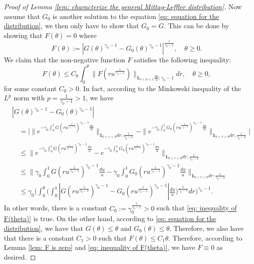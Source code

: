 \documentclass[12pt, a4paper]{amsart}
\theoremstyle{definition}
\numberwithin{equation}{section}
\begin{document}
\begin{proof}[Proof of Lemma \ref{lem: characterize the general Mittag-Leffler distribution}]
	Now assume that $G_0$ is another solution to the equation \eqref{eq: equation for the distribution}, we then only have to show that $G_0 = G$.
	This can be done by showing that $F(\theta) = 0$ where
\[
		F(\theta) := |G(\theta)^{\gamma_0 - 1} - G_0(\theta)^{\gamma_0 - 1}|^{\frac{1}{\gamma_0 - 1}},
		\quad \theta \geq 0.
\]
	We claim that the non-negative function $F$ satisfies 
	the following inequality:
\[\label{eq: inequality of F(theta)}
	F(\theta)
	\leq C_0 \int_0^\theta \|  F(ru^{\frac{1}{\gamma_0 - 1}})\|_{\mathbf 1_{0<u<1}\frac{du}{u}; \gamma_0 - 1} dr, \quad \theta \geq 0,
\]
	for some constant $C_0 > 0$.
	In fact, according to the Minkowski inequality of the $L^p$ norm with $p = \frac{1}{\gamma_0 - 1} > 1$, we have
\[\begin{split}
	&|G(\theta)^{\gamma_0 - 1} - G_0(\theta)^{\gamma_0 - 1}|
	\\&\quad = \Big| \|e^{-\gamma_0\int_0^1 G(ru^{\frac{1}{\gamma_0 - 1}})^{\gamma_0 - 1} \frac{du}{u}} \|_{\mathbf 1_{0<r<\theta}dr;\frac{1}{\gamma_0 - 1}} - \|e^{-\gamma_0\int_0^1 G_0(ru^{\frac{1}{\gamma_0 - 1}})^{\gamma_0 - 1} \frac{du}{u}} \|_{\mathbf 1_{0<r<\theta}dr;\frac{1}{\gamma_0 - 1}} \Big|
	\\ & \quad \leq \| e^{-\gamma_0\int_0^1 G(ru^{\frac{1}{\gamma_0 - 1}})^{\gamma_0 - 1} \frac{du}{u}} - e^{-\gamma_0\int_0^1 G_0(ru^{\frac{1}{\gamma_0 - 1}})^{\gamma_0 - 1} \frac{du}{u}} \|_{\mathbf 1_{0<r<\theta}dr;\frac{1}{\gamma_0 - 1}}
	\\ & \quad \leq \Big\| \gamma_0\int_0^1 G(ru^{\frac{1}{\gamma_0 - 1}})^{\gamma_0 - 1} \frac{du}{u} - \gamma_0\int_0^1 G_0(ru^{\frac{1}{\gamma_0 - 1}})^{\gamma_0 - 1} \frac{du}{u} \Big\|_{\mathbf 1_{0<r<\theta}dr;\frac{1}{\gamma_0 - 1}}
	\\ & \quad \leq \gamma_0 \Bigg( \int_0^\theta \Big( \int_0^1 |G(ru^{\frac{1}{\gamma_0 - 1}})^{\gamma_0 - 1} - G_0(ru^{\frac{1}{\gamma_0 - 1}})^{\gamma_0 - 1}| \frac{du}{u} \Big)^{\frac{1}{\gamma_0 - 1}} dr \Bigg)^{\gamma_0 - 1}.
\end{split}\]
	In other words, there is a constant $C_0:= \gamma_0^{\frac{1}{\gamma_0 - 1}}>0$ such that \eqref{eq: inequality of F(theta)} is true.
	On the other hand, according to \eqref{eq: equation for the distribution}, 
	we have that $G(\theta) \leq \theta$ and $G_0(\theta) \leq \theta$.
	Therefore, we also have that there is a constant $C_1 > 0$ such that $F(\theta) \leq C_1 \theta$.
	Therefore, according to Lemma \ref{lem: F is zero} and \eqref{eq: inequality of F(theta)}, we have $F \equiv 0$ as desired.
\end{proof}
\end{document}
